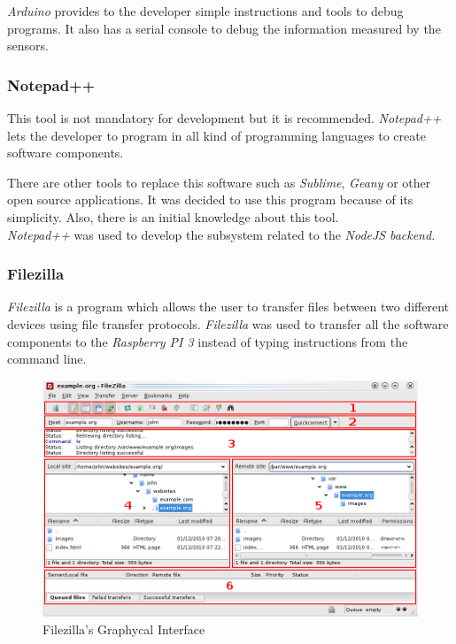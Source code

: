 \textit{Arduino} provides to the developer simple instructions and tools to debug programs. It also has a serial console to debug the information measured by the sensors.

\subsubsection{Notepad++}

This tool is not mandatory for development but it is recommended. \textit{Notepad++} lets the developer to program in all kind of programming languages to create software components.

There are other tools to replace this software such as \textit{Sublime}, \textit{Geany} or other open source applications. It was decided to use this program because of its simplicity. Also, there is an initial knowledge about this tool.\\

\textit{Notepad++} was used to develop the subsystem related to the \textit{NodeJS} \textit{backend}.

\subsubsection{Filezilla}

\textit{Filezilla} is a program which allows the user to transfer files between two different devices using file transfer protocols. \textit{Filezilla} was used to transfer all the software components to the \textit{Raspberry PI 3} instead of typing instructions from the command line.\\

\begin{figure}[H]
\begin{centering}
\includegraphics[scale=0.9]{IMGS/FILEZILLA.png}
\caption{Filezilla's Graphycal Interface \label{FILEZILLA}}
\end{centering}
\end{figure}


